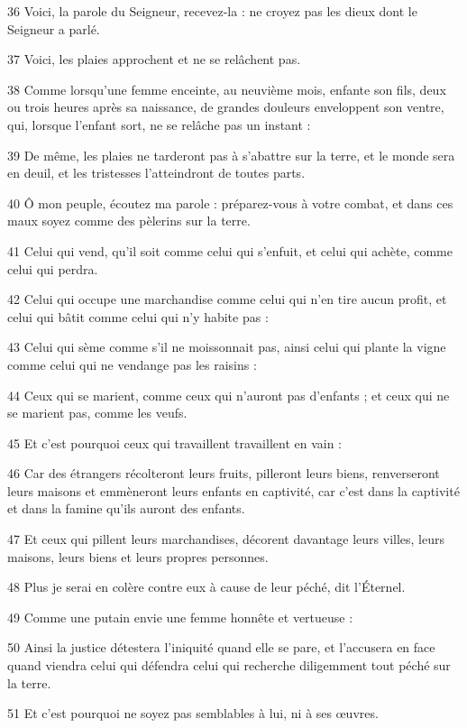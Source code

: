 \par 36 Voici, la parole du Seigneur, recevez-la : ne croyez pas les dieux dont le Seigneur a parlé.
\par 37 Voici, les plaies approchent et ne se relâchent pas.
\par 38 Comme lorsqu'une femme enceinte, au neuvième mois, enfante son fils, deux ou trois heures après sa naissance, de grandes douleurs enveloppent son ventre, qui, lorsque l'enfant sort, ne se relâche pas un instant :
\par 39 De même, les plaies ne tarderont pas à s'abattre sur la terre, et le monde sera en deuil, et les tristesses l'atteindront de toutes parts.
\par 40 Ô mon peuple, écoutez ma parole : préparez-vous à votre combat, et dans ces maux soyez comme des pèlerins sur la terre.
\par 41 Celui qui vend, qu'il soit comme celui qui s'enfuit, et celui qui achète, comme celui qui perdra.
\par 42 Celui qui occupe une marchandise comme celui qui n'en tire aucun profit, et celui qui bâtit comme celui qui n'y habite pas :
\par 43 Celui qui sème comme s'il ne moissonnait pas, ainsi celui qui plante la vigne comme celui qui ne vendange pas les raisins :
\par 44 Ceux qui se marient, comme ceux qui n'auront pas d'enfants ; et ceux qui ne se marient pas, comme les veufs.
\par 45 Et c'est pourquoi ceux qui travaillent travaillent en vain :
\par 46 Car des étrangers récolteront leurs fruits, pilleront leurs biens, renverseront leurs maisons et emmèneront leurs enfants en captivité, car c'est dans la captivité et dans la famine qu'ils auront des enfants.
\par 47 Et ceux qui pillent leurs marchandises, décorent davantage leurs villes, leurs maisons, leurs biens et leurs propres personnes.
\par 48 Plus je serai en colère contre eux à cause de leur péché, dit l'Éternel.
\par 49 Comme une putain envie une femme honnête et vertueuse :
\par 50 Ainsi la justice détestera l'iniquité quand elle se pare, et l'accusera en face quand viendra celui qui défendra celui qui recherche diligemment tout péché sur la terre.
\par 51 Et c'est pourquoi ne soyez pas semblables à lui, ni à ses œuvres.
